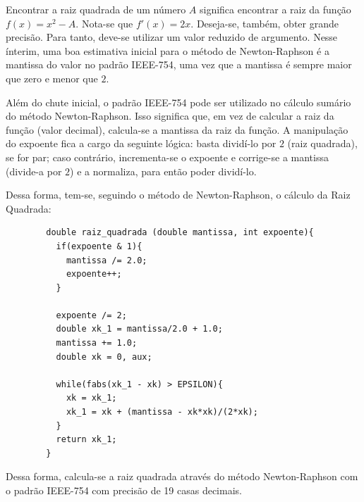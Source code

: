 	Encontrar a raiz quadrada de um número $A$ significa encontrar a raiz da função $f(x) = x^2 - A$.
	Nota-se que $f'(x) = 2x$. Deseja-se, também, obter grande precisão. Para tanto, deve-se utilizar
	um valor reduzido de argumento. Nesse ínterim, uma boa estimativa inicial para o método de Newton-Raphson
	é a mantissa do valor no padrão IEEE-754, uma vez que a mantissa é sempre maior que zero e menor que $2$.

	Além do chute inicial, o padrão IEEE-754 pode ser utilizado no cálculo sumário do método Newton-Raphson. Isso
	significa que, em vez de calcular a raiz da função (valor decimal), calcula-se a mantissa da raiz da função.
	A manipulação do expoente fica a cargo da seguinte lógica: basta dividí-lo por $2$ (raiz quadrada), se for par;
	caso contrário, incrementa-se o expoente e corrige-se a mantissa (divide-a por $2$) e a normaliza, para então
	poder dividí-lo.

	Dessa forma, tem-se, seguindo o método de Newton-Raphson, o cálculo da Raiz Quadrada:
	\begin{verbatim}
		double raiz_quadrada (double mantissa, int expoente){
		  if(expoente & 1){
		    mantissa /= 2.0;
		    expoente++;
		  }

		  expoente /= 2;
		  double xk_1 = mantissa/2.0 + 1.0;
		  mantissa += 1.0;
		  double xk = 0, aux;

		  while(fabs(xk_1 - xk) > EPSILON){
		    xk = xk_1;
		    xk_1 = xk + (mantissa - xk*xk)/(2*xk);
		  }
		  return xk_1;
		}
	\end{verbatim}

	Dessa forma, calcula-se a raiz quadrada através do método Newton-Raphson com o padrão IEEE-754
	com precisão de 19 casas decimais.

